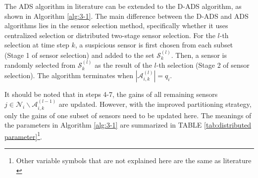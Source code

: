 The ADS algorithm in literature \cite{Suo2024Security} can be extended to the D-ADS algorithm, as shown in Algorithm \ref{alg:3-1}. The main difference between the D-ADS and ADS algorithms lies in the sensor selection method, specifically whether it uses centralized selection or distributed two-stage sensor selection. For the $l$-th selection at time step $k$, a suspicious sensor is first chosen from each subset (Stage 1 of sensor selection) and added to the set $\mathcal{S}^{(l)}_k$. Then, a sensor is randomly selected from $\mathcal{S}^{(l)}_k$ as the result of the $l$-th selection (Stage 2 of sensor selection). The algorithm terminates when $|\mathcal{A}_{i,k}^{(l)}|=q_i$. 

It should be noted that in steps 4-7, the gains of all remaining sensors $j \in \mathcal{N}_i \backslash \mathcal{A}_{i,k}^{(l-1)}$ are updated. However, with the improved partitioning strategy, only the gains of one subset of sensors need to be updated here. The meanings of the parameters in Algorithm \ref{alg:3-1} are summarized in TABLE \ref{tab:distributed parameter}\footnote{Other variable symbols that are not explained here are  the same  as literature \cite{Suo2024Security}}.

